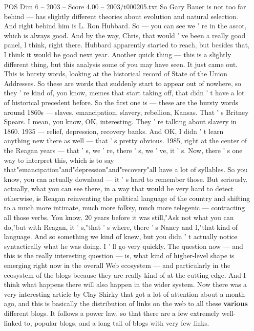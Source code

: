 \begin{textsample}{POS Dim 6 – 2003 – Score 4.00 – 2003/t000205.txt}
So Gary Bauer is not too far behind — has slightly different theories about evolution and natural selection.
And right behind him is L.
Ron Hubbard.
So — you can see we ' re in the ascot, which is always good.
And by the way, Chris, that would ' ve been a really good panel, I think, right there.
Hubbard apparently started to reach, but besides that, I think it would be good next year.
Another quick thing — this is a slightly different thing, but this analysis some of you may have seen.
It just came out.
This is bursty words, looking at the historical record of State of the Union Addresses.
So these are words that suddenly start to appear out of nowhere, so they ' re kind of, you know, memes that start taking off, that didn ' t have a lot of historical precedent before.
So the first one is — these are the bursty words around 1860s — slaves, emancipation, slavery, rebellion, Kansas.
That ' s Britney Spears.
I mean, you know, OK, interesting.
They ' re talking about slavery in 1860. 1935 — relief, depression, recovery banks.
And OK, I didn ' t learn anything new there as well — that ' s pretty obvious. 1985, right at the center of the Reagan years — that ' s, we ' re, there ' s, we ' ve, it ' s.
Now, there ' s one way to interpret this, which is to say that"emancipation"and"depression"and"recovery"all have a lot of syllables.
So you know, you can actually download — it ' s hard to remember those.
But seriously, actually, what you can see there, in a way that would be very hard to detect otherwise, is Reagan reinventing the political language of the country and shifting to a much more intimate, much more folksy, much more telegenic — contracting all those verbs.
You know, 20 years before it was still,"Ask not what you can do,"but with Reagan, it ' s,"that ' s where, there ' s Nancy and I,"that kind of language.
And so something we kind of knew, but you didn ' t actually notice syntactically what he was doing.
I ' ll go very quickly.
The question now — and this is the really interesting question — is, what kind of higher-level shape is emerging right now in the overall Web ecosystem — and particularly in the ecosystem of the blogs because they are really kind of at the cutting edge.
And I think what happens there will also happen in the wider system.
Now there was a very interesting article by Clay Shirky that got a lot of attention about a month ago, and this is basically the distribution of links on the web to all these \textbf{various} different blogs.
It follows a power law, so that there are a few extremely well-linked to, popular blogs, and a long tail of blogs with very few links.

\end{textsample}
